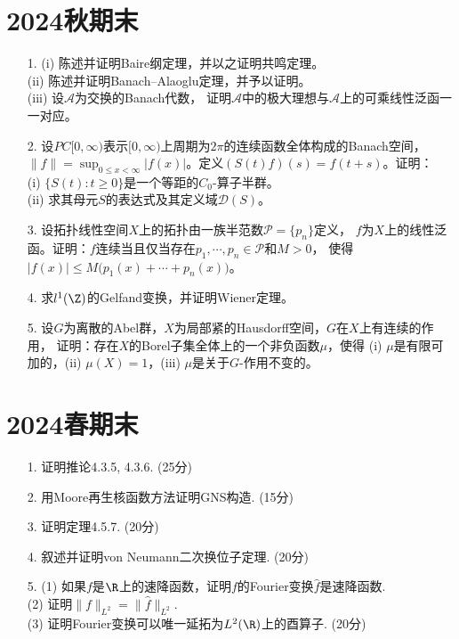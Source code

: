 \section{2024秋期末}
\begin{itemize}
\item[1.] (i) 陈述并证明Baire纲定理，并以之证明共鸣定理。\\
(ii) 陈述并证明Banach--Alaoglu定理，并予以证明。\\
(iii) 设$\mathcal{A}$为交换的Banach代数，
证明$\mathcal{A}$中的极大理想与$\mathcal{A}$上的可乘线性泛函一一对应。

\item[2.] 设$PC[0,\infty)$表示$[0,\infty)$上周期为$2\pi$的连续函数全体构成的Banach空间，
$\|f\|=\sup_{0 \leqslant x < \infty}|f(x)|$。定义$(S(t)f)(s)=f(t+s)$。证明：\\
(i) $\{S(t):t\geqslant0\}$是一个等距的$C_0$-算子半群。\\
(ii) 求其母元$S$的表达式及其定义域$\mathcal{D}(S)$。

\item[3.] 设拓扑线性空间$X$上的拓扑由一族半范数$\mathcal{P}=\{p_n\}$定义，
$f$为$X$上的线性泛函。证明：$f$连续当且仅当存在$p_1,\cdots,p_n\in\mathcal{P}$和$M>0$，
使得$|f(x)| \leqslant M\big(p_1(x)+\cdots+p_n(x)\big)$。

\item[4.] 求$l^1(\Z)$的Gelfand变换，并证明Wiener定理。

\item[5.] 设$G$为离散的Abel群，$X$为局部紧的Hausdorff空间，$G$在$X$上有连续的作用，
证明：存在$X$的Borel子集全体上的一个非负函数$\mu$，使得
(i) $\mu$是有限可加的，(ii) $\mu(X)=1$，(iii) $\mu$是关于$G$-作用不变的。
\end{itemize}

\section{2024春期末}
\begin{itemize}
\item[1.] 证明推论4.3.5, 4.3.6. (25分)

\item[2.] 用Moore再生核函数方法证明GNS构造. (15分)

\item[3.] 证明定理4.5.7. (20分)

\item[4.] 叙述并证明von Neumann二次换位子定理. (20分)

\item[5.] (1) 如果$f$是$\R$上的速降函数，证明$f$的Fourier变换$\hat{f}$是速降函数.\\
(2) 证明$\|f\|_{L^2}=\|\hat{f}\|_{L^2}$.\\
(3) 证明Fourier变换可以唯一延拓为$L^2(\R)$上的酉算子. (20分)
\end{itemize}

